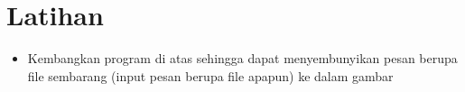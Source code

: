 \documentclass{article}
\begin{document}

\section*{Latihan}

\begin{itemize}
    \item Kembangkan program di atas sehingga dapat menyembunyikan pesan berupa file sembarang (input pesan berupa file apapun) ke dalam gambar
\end{itemize}
\end{document}
